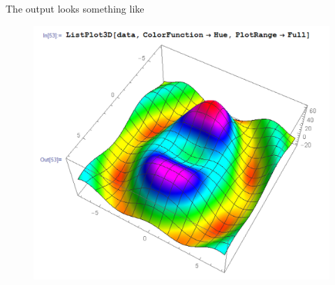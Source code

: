 \documentclass{article}
\theoremstyle{definition}
\begin{document}
The output looks something like 
\begin{figure}[!htb]
	\centering
	\includegraphics[scale=0.3]{conv-6}
\end{figure}



































	
\end{document}
